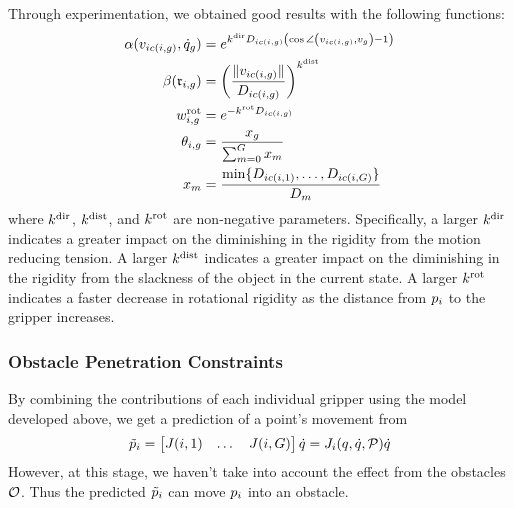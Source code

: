 Through experimentation, we obtained good results with the following functions:
\begin{equation}
\begin{split}
    \alpha(v_{i c(i, g)}, \dot{q}_g)  &= e^{k^\textrm{dir} D_{i c(i, g)} \left(\cos \angle \left( v_{i c(i, g)}, v_g \right) - 1\right)} \\
    \beta(\mathfrak{r}_{i, g})    &= \left( \frac{\| v_{i c(i, g)} \|}{D_{i c(i, g)}} \right) ^{k^\textrm{dist}} \\
    w^{\textrm{rot}}_{i, g}  &= e^{-k^{\textrm{rot}} D_{i c(i, g)}} \\
    \theta_{i, g}    &= \frac{x_g}{\sum_{m = 0}^G x_m}\\
    x_m             &= \frac{\textrm{min} \{D_{i c(i, 1)}, \dots , D_{i c(i, G)}\}}{D_m} 
\end{split}
\label{eq:directional_rigidity_factors}
\end{equation}
where $k^\textrm{dir}$, $k^\textrm{dist}$, and $k^{\textrm{rot}}$ are non-negative parameters. Specifically, a larger $k^\textrm{dir}$ indicates a greater impact on the diminishing in the rigidity from the motion reducing tension. A larger $k^\textrm{dist}$ indicates a greater impact on the diminishing in the rigidity from the slackness of the object in the current state. A larger $k^{\textrm{rot}}$ indicates a faster decrease in rotational rigidity as the distance from $p_i$ to the gripper increases. 

\subsubsection{Obstacle Penetration Constraints}

By combining the contributions of each individual gripper using the model developed above, we get a prediction of a point's movement from
\begin{equation}
    \tilde{p}_i = \begin{bmatrix}
        J(i, 1) & \dots & 
        J(i, G)
    \end{bmatrix} \dot{q} = J_{i}(q, \dot{q}, \mathcal{P}) \dot{q}
\end{equation}
However, at this stage, we haven't take into account the effect from the obstacles $\mathcal{O}$. Thus the predicted $\tilde{p}_i$ can move $p_i$ into an obstacle.

